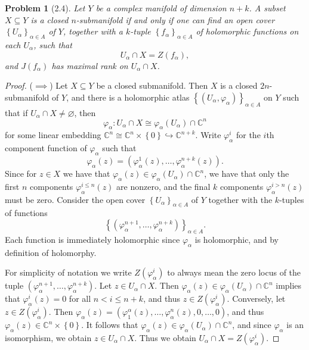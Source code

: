\documentclass[11pt, letterpaper]{article}
\theoremstyle{plain}
\newtheorem{problem}{Problem}
\begin{document}
\begin{problem}[2.4]
	Let $Y$ be a complex manifold of dimension $n+k$. A subset $X\subseteq Y$ is a closed $n$-submanifold if and only if one can find an open cover $\left\{ U_\alpha  \right\}_{\alpha \in A} $ of $Y$, together with a $k$-tuple $\left\{ f_\alpha  \right\}_{\alpha \in A} $ of holomorphic functions on each $U_\alpha $, such that
	\[
		U_\alpha \cap X = Z(f_\alpha ),
	\]
	and $J(f_\alpha )$ has maximal rank on $U_\alpha \cap X$.
\end{problem}
\begin{proof}
	($\implies $) Let $X\subseteq Y$ be a closed submanifold. Then $X$ is a closed $2n$-submanifold of $Y$, and there is a holomorphic atlas $\left\{ (U_\alpha ,\varphi _\alpha ) \right\} _{\alpha \in A} $ on $Y$ such that if $U_\alpha \cap X \neq \varnothing $, then
	\[
		\varphi _\alpha : U_\alpha \cap X \cong \varphi_\alpha  (U_\alpha )\cap \mathbb{C} ^n
	\]
	for some linear embedding $\mathbb{C} ^n\cong \mathbb{C} ^n\times \left\{ 0 \right\} \hookrightarrow \mathbb{C} ^{n+k} $. Write $\varphi_\alpha ^i$ for the $i$th component function of $\varphi _\alpha $ such that
	\[
		\varphi _\alpha (z)=(\varphi _\alpha ^1(z), \ldots ,\varphi _\alpha ^{n+k} (z))
	.\]
	Since for $z\in X$ we have that $\varphi_\alpha (z)\in \varphi_\alpha (U_\alpha )\cap \mathbb{C} ^{n} $, we have that only the first $n$ components $\varphi _\alpha ^{i\leq n} (z)$ are nonzero, and the final $k$ components $\varphi _\alpha ^{i > n} (z)$ must be zero. Consider the open cover $\left\{ U_\alpha  \right\}_{\alpha \in A} $ of $Y$ together with the $k$-tuples of functions
	\[
		\left\{ \left(\varphi_{\alpha }^{n+1}, \ldots , \varphi _\alpha ^{n+k} \right) \right\}_{\alpha \in A} 
	.\]
	Each function is immediately holomorphic since $\varphi _\alpha $ is holomorphic, and by definition of holomorphy.

	For simplicity of notation we write $Z(\varphi _\alpha ^i)$ to always mean the zero locus of the tuple $\left( \varphi _\alpha ^{n+1} , \ldots , \varphi_\alpha ^{n+k}  \right) $. Let $z\in U_\alpha \cap X$. Then $\varphi_\alpha (z) \in \varphi _\alpha (U_\alpha )\cap \mathbb{C} ^n$ implies that $\varphi _\alpha ^i(z)=0$ for all $n<i\leq n+k$, and thus $z\in Z(\varphi_\alpha^i)$. Conversely, let $z\in Z(\varphi _\alpha ^i)$. Then $\varphi _\alpha (z) = (\varphi_1^\alpha (z), \ldots ,\varphi _\alpha ^n(z), 0, \ldots ,0)$, and thus $\varphi _\alpha (z)\in \mathbb{C} ^n\times \left\{ 0 \right\} $. It follows that $\varphi _\alpha (z)\in \varphi _\alpha (U_\alpha )\cap \mathbb{C} ^n$, and since $\varphi _\alpha $ is an isomorphism, we obtain $z\in U_\alpha \cap X$. Thus we obtain $U_\alpha \cap X = Z(\varphi _\alpha ^i)$.


\end{proof}
\end{document}
